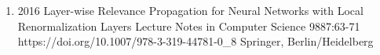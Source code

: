 {\begin{enumerate}
        \item {}
                            {2016}
                            {Layer-wise Relevance Propagation for Neural Networks with Local Renormalization Layers}
                            {Lecture Notes in Computer Science}
                            {9887:63-71}
                            {https://doi.org/10.1007/978-3-319-44781-0_8}
                            {Springer, Berlin/Heidelberg}
    \end{enumerate}

}
